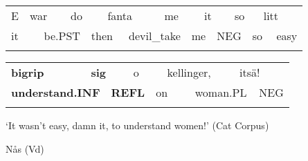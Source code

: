 \begin{tabular}{llllllllllllllll}
\lsptoprule
E & \multicolumn{2}{l}{war

} & \multicolumn{2}{l}{do

} & \multicolumn{2}{l}{fanta

} & \multicolumn{2}{l}{me

} & \multicolumn{2}{l}{it

} & \multicolumn{2}{l}{so

} & \multicolumn{2}{l}{litt

} & \\
\multicolumn{2}{l}{it

} & \multicolumn{2}{l}{be.PST

} & \multicolumn{2}{l}{then

} & \multicolumn{2}{l}{devil\_take

} & \multicolumn{2}{l}{me

} & \multicolumn{2}{l}{NEG

} & \multicolumn{2}{l}{so

} & \multicolumn{2}{l}{easy

}\\
\lspbottomrule
\end{tabular}

\begin{tabular}{llllllllll}
\lsptoprule
{\bfseries bigrip} & \multicolumn{2}{l}{{\bfseries sig}

} & \multicolumn{2}{l}{o

} & \multicolumn{2}{l}{kellinger,

} & \multicolumn{2}{l}{itsä!

} & \\
\multicolumn{2}{l}{{\bfseries understand.INF}

} & \multicolumn{2}{l}{{\bfseries REFL}

} & \multicolumn{2}{l}{on

} & \multicolumn{2}{l}{woman.PL

} & \multicolumn{2}{l}{NEG

}\\
\lspbottomrule
\end{tabular}

\begin{styleTranslation}
 ‘It wasn’t easy, damn it, to understand women!’ (Cat Corpus)

\end{styleTranslation}

\begin{listWWNumileveli}
\item 

\begin{styleExample}
Nås (Vd)

\end{styleExample}

\end{listWWNumileveli}

